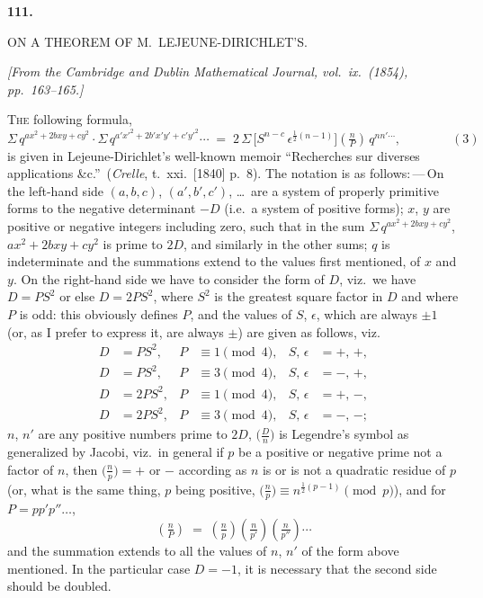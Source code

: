 \documentclass[11pt]{article}
\begin{document}
\clearpage


\begin{center}\textbf{111.}\par\medskip
{\large ON A THEOREM OF M.\ LEJEUNE-DIRICHLET'S.}
\end{center}

\noindent\emph{[From the Cambridge and Dublin Mathematical Journal, vol.\ ix.\ (1854), pp.\ 163--165.]}

\bigskip

\noindent\textsc{The} following formula,
\[
\Sigma\, q^{ax^{2} + 2bxy + cy^{2}} \cdot \Sigma\, q^{a'x'^{2} + 2b'x'y' + c'y'^{2}} \cdots \;=\; 2\,\Sigma\,\bigl[S^{n-c}\,\epsilon^{\frac{1}{2}(n-1)} \bigr]\!\left(\tfrac{n}{P}\right)\,q^{nn'\cdots},\qquad\qquad (3)
\]
\noindent is given in Lejeune-Dirichlet's well-known memoir ``Recherches sur diverses applications \&c.''\ (\emph{Crelle}, t.\ xxi.\ [1840] p.\ 8). The notation is as follows:\,---\,On the left-hand side $(a, b, c)$, $(a', b', c')$, \ldots\ are a system of properly primitive forms to the negative determinant $-D$ (i.e.\ a system of positive forms); $x$, $y$ are positive or negative integers including zero, such that in the sum $\Sigma\, q^{ax^{2} + 2bxy + cy^{2}}$, $ax^{2} + 2bxy + cy^{2}$ is prime to $2D$, and similarly in the other sums; $q$ is indeterminate and the summations extend to the values first mentioned, of $x$ and $y$. On the right-hand side we have to consider the form of $D$, viz.\ we have $D = PS^{2}$ or else $D = 2 P S^{2}$, where $S^{2}$ is the greatest square factor in $D$ and where $P$ is odd: this obviously defines $P$, and the values of $S$, $\epsilon$, which are always $\pm 1$ (or, as I prefer to express it, are always $\pm$) are given as follows, viz.
\begin{align*}
D &= P S^{2}, & P &\equiv 1 \pmod 4, & S,\,\epsilon &= +,\,+,\\
D &= P S^{2}, & P &\equiv 3 \pmod 4, & S,\,\epsilon &= -,\,+,\\
D &= 2 P S^{2}, & P &\equiv 1 \pmod 4, & S,\,\epsilon &= +,\,-,\\
D &= 2 P S^{2}, & P &\equiv 3 \pmod 4, & S,\,\epsilon &= -,\,-;
\end{align*}
$n$, $n'$ are any positive numbers prime to $2D$, $\bigl(\tfrac{D}{n}\bigr)$ is Legendre's symbol as generalized by Jacobi, viz.\ in general if $p$ be a positive or negative prime not a factor of $n$, then $\bigl(\tfrac{n}{p}\bigr) = +$ or $-$ according as $n$ is or is not a quadratic residue of $p$ (or, what is the same thing, $p$ being positive, $\bigl(\tfrac{n}{p}\bigr) \equiv n^{\frac{1}{2}(p-1)} \pmod p$), and for $P = p p' p'' \ldots$,
\[
\left(\tfrac{n}{P}\right) \;=\; \left(\tfrac{n}{p}\right)\!\left(\tfrac{n}{p'}\right)\!\left(\tfrac{n}{p''}\right)\cdots
\]
and the summation extends to all the values of $n$, $n'$ of the form above mentioned. In the particular case $D = -1$, it is necessary that the second side should be doubled.
\end{document}
